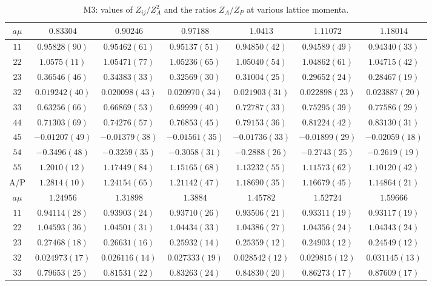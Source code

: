 \begin{table}
\begin{center}
\caption{M3: values of $Z_{ij}/Z_A^2$ and the ratios $Z_A/Z_P$ at various lattice momenta.}
\begin{tabular}{c|c c c c c c}
\hline
\hline
$a\mu$ & $0.83304$ & $0.90246$ & $0.97188$ & $1.0413$ & $1.11072$ & $1.18014$ \\
\hline
$11$ & $0.95828(90)$ & $0.95462(61)$ & $0.95137(51)$ & $0.94850(42)$ & $0.94589(49)$ & $0.94340(33)$ \\
$22$ & $1.0575(11)$ & $1.05471(77)$ & $1.05236(65)$ & $1.05040(54)$ & $1.04862(61)$ & $1.04715(42)$ \\
$23$ & $0.36546(46)$ & $0.34383(33)$ & $0.32569(30)$ & $0.31004(25)$ & $0.29652(24)$ & $0.28467(19)$ \\
$32$ & $0.019242(40)$ & $0.020098(43)$ & $0.020970(34)$ & $0.021903(31)$ & $0.022898(23)$ & $0.023887(20)$ \\
$33$ & $0.63256(66)$ & $0.66869(53)$ & $0.69999(40)$ & $0.72787(33)$ & $0.75295(39)$ & $0.77586(29)$ \\
$44$ & $0.71303(69)$ & $0.74276(57)$ & $0.76853(45)$ & $0.79153(36)$ & $0.81224(42)$ & $0.83130(31)$ \\
$45$ & $-0.01207(49)$ & $-0.01379(38)$ & $-0.01561(35)$ & $-0.01736(33)$ & $-0.01899(29)$ & $-0.02059(18)$ \\
$54$ & $-0.3496(48)$ & $-0.3259(35)$ & $-0.3058(31)$ & $-0.2888(26)$ & $-0.2743(25)$ & $-0.2619(19)$ \\
$55$ & $1.2010(12)$ & $1.17449(84)$ & $1.15165(68)$ & $1.13232(55)$ & $1.11573(62)$ & $1.10120(42)$ \\
\hline
A/P & $1.2814(10)$ & $1.24154(65)$ & $1.21142(47)$ & $1.18690(35)$ & $1.16679(45)$ & $1.14864(21)$ \\
\hline
$a\mu$ & $1.24956$ & $1.31898$ & $1.3884$ & $1.45782$ & $1.52724$ & $1.59666$ \\
\hline
$11$ & $0.94114(28)$ & $0.93903(24)$ & $0.93710(26)$ & $0.93506(21)$ & $0.93311(19)$ & $0.93117(19)$ \\
$22$ & $1.04593(36)$ & $1.04501(31)$ & $1.04434(33)$ & $1.04386(27)$ & $1.04356(24)$ & $1.04343(24)$ \\
$23$ & $0.27468(18)$ & $0.26631(16)$ & $0.25932(14)$ & $0.25359(12)$ & $0.24903(12)$ & $0.24549(12)$ \\
$32$ & $0.024973(17)$ & $0.026116(14)$ & $0.027333(19)$ & $0.028542(12)$ & $0.029815(12)$ & $0.031145(13)$ \\
$33$ & $0.79653(25)$ & $0.81531(22)$ & $0.83263(24)$ & $0.84830(20)$ & $0.86273(17)$ & $0.87609(17)$ \\

\end{tabular}
\end{center}
\end{table}
